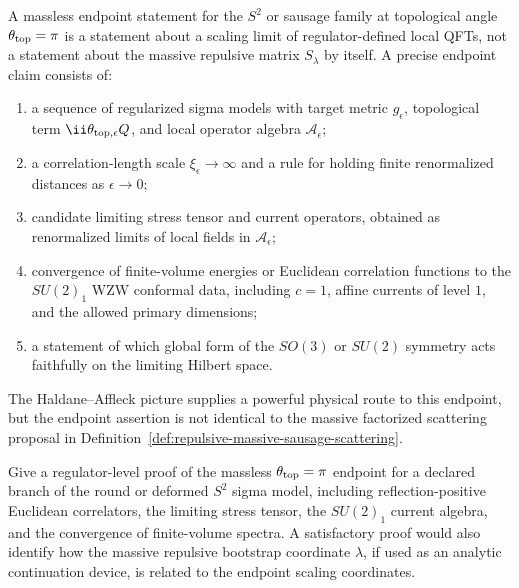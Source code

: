 \begin{definition}[Massless \(\theta=\pi\) endpoint problem]
\label{def:sausage-theta-pi-endpoint-problem}
A massless endpoint statement for the \(S^2\) or sausage family at topological
angle \(\theta_{\rm top}=\pi\) is a statement about a scaling limit of
regulator-defined local QFTs, not a statement about the massive repulsive
matrix \(S_\lambda\) by itself.  A precise endpoint claim consists of:
\begin{enumerate}
  \item a sequence of regularized sigma models with target metric
  \(g_{\epsilon}\), topological term \(\ii\theta_{\rm top,\epsilon}Q\), and
  local operator algebra \(\mathcal A_\epsilon\);
  \item a correlation-length scale \(\xi_\epsilon\to\infty\) and a rule for
  holding finite renormalized distances as \(\epsilon\to0\);
  \item candidate limiting stress tensor and current operators, obtained as
  renormalized limits of local fields in \(\mathcal A_\epsilon\);
  \item convergence of finite-volume energies or Euclidean correlation
  functions to the \(SU(2)_1\) WZW conformal data, including \(c=1\), affine
  currents of level \(1\), and the allowed primary dimensions;
  \item a statement of which global form of the \(SO(3)\) or \(SU(2)\)
  symmetry acts faithfully on the limiting Hilbert space.
\end{enumerate}
The Haldane--Affleck picture supplies a powerful physical route to this
endpoint, but the endpoint assertion is not identical to the massive
factorized scattering proposal in
Definition~\ref{def:repulsive-massive-sausage-scattering}.
\end{definition}

\begin{openproblem}
\label{op:sausage-massless-theta-pi-endpoint}
Give a regulator-level proof of the massless
\(\theta_{\rm top}=\pi\) endpoint for a declared branch of the round or
deformed \(S^2\) sigma model, including reflection-positive Euclidean
correlators, the limiting stress tensor, the \(SU(2)_1\) current algebra, and
the convergence of finite-volume spectra.  A satisfactory proof would also
identify how the massive repulsive bootstrap coordinate \(\lambda\), if used
as an analytic continuation device, is related to the endpoint scaling
coordinates.
\end{openproblem}

